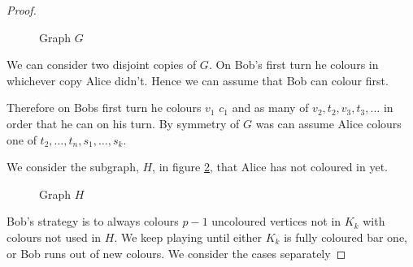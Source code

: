 \begin{proof}
\begin{figure}[H]
    \caption{Graph $G$}
\label{fig:pwlowerbound1}
\end{figure}

We can consider two disjoint copies of $G$. On Bob's first turn he colours in whichever copy Alice didn't. Hence we can assume that Bob can colour first.

Therefore on Bobs first turn he colours $v_1$ $c_1$ and as many of $v_2,t_2,v_3,t_3,\dots$ in order that he can on his turn.
 By symmetry of $G$ was can assume Alice colours one of $t_2,\dots,t_n,s_1,\dots,s_k$. 

We consider the subgraph, $H$, in figure \ref{fig:pwlowerbound2}, that Alice has not coloured in yet. 

\begin{figure}[H]
    \centering
{}
    \caption{Graph $H$}
    \label{fig:pwlowerbound2}
\end{figure}


Bob's strategy is to always colours $p-1$ uncoloured vertices not in $K_k$ with colours not used in $H$. We keep playing until either $K_k$ is fully coloured bar one, or Bob runs out of new colours. We consider the cases separately 


\end{proof}
